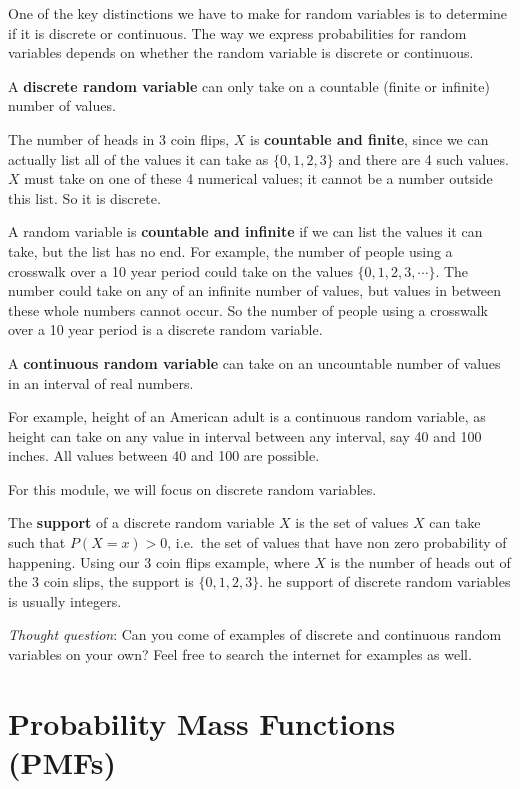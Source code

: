 \documentclass[
]{book}
\begin{document}
One of the key distinctions we have to make for random variables is to determine if it is discrete or continuous. The way we express probabilities for random variables depends on whether the random variable is discrete or continuous.

A \textbf{discrete random variable} can only take on a countable (finite or infinite) number of values.

The number of heads in 3 coin flips, \(X\) is \textbf{countable and finite}, since we can actually list all of the values it can take as \(\{0,1,2,3 \}\) and there are 4 such values. \(X\) must take on one of these 4 numerical values; it cannot be a number outside this list. So it is discrete.

A random variable is \textbf{countable and infinite} if we can list the values it can take, but the list has no end. For example, the number of people using a crosswalk over a 10 year period could take on the values \(\{0, 1, 2, 3, \cdots \}\). The number could take on any of an infinite number of values, but values in between these whole numbers cannot occur. So the number of people using a crosswalk over a 10 year period is a discrete random variable.

A \textbf{continuous random variable} can take on an uncountable number of values in an interval of real numbers.

For example, height of an American adult is a continuous random variable, as height can take on any value in interval between any interval, say 40 and 100 inches. All values between 40 and 100 are possible.

For this module, we will focus on discrete random variables.

The \textbf{support} of a discrete random variable \(X\) is the set of values \(X\) can take such that \(P(X = x) > 0\), i.e.~the set of values that have non zero probability of happening. Using our 3 coin flips example, where \(X\) is the number of heads out of the 3 coin slips, the support is \(\{0,1,2,3 \}\). he support of discrete random variables is usually integers.

\emph{Thought question}: Can you come of examples of discrete and continuous random variables on your own? Feel free to search the internet for examples as well.

\section{Probability Mass Functions (PMFs)}\label{probability-mass-functions-pmfs}
\end{document}
